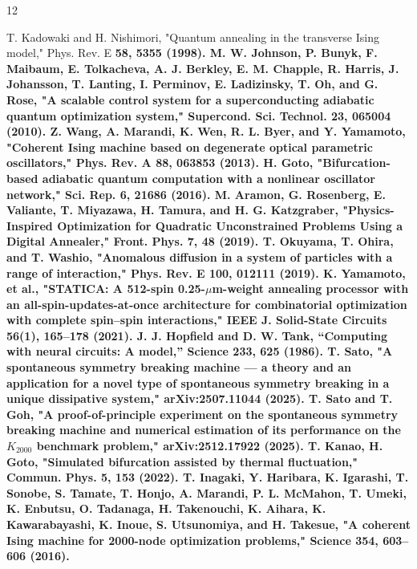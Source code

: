 \documentclass[%
 reprint,
 amsmath,amssymb,
 aps,
]{revtex4-2}
\begin{document}
\begin{thebibliography}{12}


T. Kadowaki and H. Nishimori, "Quantum annealing in the transverse Ising model," Phys. Rev. E \bf58\rm, 5355 (1998).
M. W. Johnson, P. Bunyk, F. Maibaum, E. Tolkacheva, A. J. Berkley, E. M. Chapple, R. Harris, J. Johansson, T. Lanting, I. Perminov, E. Ladizinsky, T. Oh, and G. Rose, "A scalable control system for a superconducting adiabatic quantum optimization system," Supercond. Sci. Technol. 23, 065004 (2010).
Z. Wang, A. Marandi, K. Wen, R. L. Byer, and Y. Yamamoto, "Coherent Ising machine based on degenerate optical parametric oscillators," Phys. Rev. A \bf88\rm, 063853 (2013).
H. Goto, "Bifurcation-based adiabatic quantum computation with a nonlinear oscillator network," Sci. Rep. \bf6\rm, 21686 (2016).
M. Aramon, G. Rosenberg, E. Valiante, T. Miyazawa, H. Tamura, and H. G. Katzgraber, "Physics-Inspired Optimization for Quadratic Unconstrained Problems Using a Digital Annealer," Front. Phys. \bf7\rm, 48 (2019).
T. Okuyama, T. Ohira, and T. Washio, "Anomalous diffusion in a system of particles with a range of interaction," Phys. Rev. E \bf100\rm, 012111 (2019).
K. Yamamoto, et al., "STATICA: A 512-spin 0.25-$\mu$m-weight annealing processor with an all-spin-updates-at-once architecture for combinatorial optimization with complete spin–spin interactions," IEEE J. Solid-State Circuits \bf56\rm(1), 165–178 (2021).
J. J. Hopfield and D. W. Tank, “Computing with neural circuits: A model,” Science \bf233\rm, 625 (1986).
T. Sato, "A spontaneous symmetry breaking machine — a theory and an application for a novel type of spontaneous symmetry breaking in a unique dissipative system," arXiv:2507.11044 (2025).
T. Sato and T. Goh, "A proof-of-principle experiment on the spontaneous symmetry breaking machine and numerical estimation of its performance on the $K_{2000}$ benchmark problem," arXiv:2512.17922 (2025).
T. Kanao, H. Goto, "Simulated bifurcation assisted by thermal fluctuation," Commun. Phys. 5, 153 (2022).
T. Inagaki, Y. Haribara, K. Igarashi, T. Sonobe, S. Tamate, T. Honjo, A. Marandi, P. L. McMahon, T. Umeki, K. Enbutsu, O. Tadanaga, H. Takenouchi, K. Aihara, K. Kawarabayashi, K. Inoue, S. Utsunomiya, and H. Takesue, "A coherent Ising machine for 2000-node optimization problems," Science \bf354\rm, 603–606 (2016).
\end{thebibliography}
\end{document}

